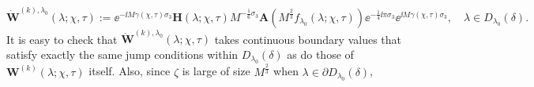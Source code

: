 \begin{equation}
\dot{\mathbf{W}}^{(k),\lambda_0}(\lambda;\chi,\tau):=\ee^{-\ii M\gamma(\chi,\tau)\sigma_3}\mathbf{H}(\lambda;\chi,\tau)M^{-\frac{1}{6}\sigma_3}\mathbf{A}(M^\frac{2}{3}f_{\lambda_0}(\lambda;\chi,\tau))\ee^{-\frac{1}{4}\ii\pi\sigma_3}\ee^{\ii M\gamma(\chi,\tau)\sigma_3},\quad\lambda\in D_{\lambda_0}(\delta).
\end{equation}
It is easy to check that 
$\dot{\mathbf{W}}^{(k),\lambda_0}(\lambda;\chi,\tau)$
takes continuous boundary values that satisfy exactly the same jump conditions within $D_{\lambda_0}(\delta)$ as do those of 
$\mathbf{W}^{(k)}(\lambda;\chi,\tau)$
itself. Also, since $\zeta$ is large of size 
$M^\frac{2}{3}$
when $\lambda\in \partial D_{\lambda_0}(\delta)$, 
